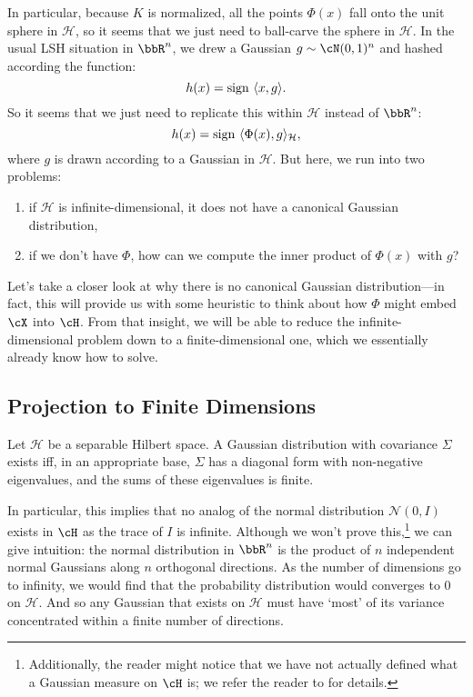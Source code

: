\documentclass[twoside,11pt]{homework}
\begin{document}
In particular, because $K$ is normalized, all the points $\Phi(x)$ fall onto the unit sphere
in $\mathcal{H}$, so it seems that we just need to ball-carve the sphere in $\mathcal{H}$.
In the usual LSH situation in $\bbR^n$, we drew a Gaussian $g \sim \cN(0,1)^n$ and hashed
according the function:
\[h(x) = \operatorname{sign}\ \langle x, g\rangle.\]
So it seems that we just need to replicate this within $\mathcal{H}$ instead of $\bbR^n$:
\[h(x) = \operatorname{sign}\ \langle \Phi(x), g\rangle_\mathcal{H},\]
where $g$ is drawn according to a Gaussian in $\mathcal{H}$. But here, we run into two problems:
\begin{enumerate}
\item if $\mathcal{H}$ is infinite-dimensional, it does not have a canonical Gaussian distribution, 
\item if we don't have $\Phi$, how can we compute the inner product of $\Phi(x)$ with $g$?
\end{enumerate}

Let's take a closer look at why there is no canonical Gaussian distribution---in fact, this will provide us with some heuristic to think about how $\Phi$ might embed $\cX$ into $\cH$. From that insight, we will be able to reduce the infinite-dimensional problem down to a finite-dimensional one, which we essentially already know how to solve.

\subsection{Projection to Finite Dimensions}

\begin{proposition}[{\cite[Example 2.2]{L2012}}] \label{infinite-distribution}Let $\mathcal{H}$ be a separable Hilbert space.
  A Gaussian distribution with covariance $\Sigma$ exists iff, in an appropriate base, $\Sigma$
  has a diagonal form with non-negative eigenvalues, and the sums of these eigenvalues is finite.
\end{proposition}

In particular, this implies that no analog of the normal distribution $\mathcal{N}(0,I)$ exists in $\cH$ as the trace of $I$ is infinite. Although we won't prove this,\footnote{Additionally, the reader might notice that we have not actually defined what a Gaussian measure on $\cH$ is; we refer the reader to \cite{L2012} for details.} we can give intuition: the normal distribution in $\bbR^n$ is the product of $n$ independent normal Gaussians along $n$ orthogonal directions. As the number of dimensions go to infinity, we would find that the probability distribution would converges to 0 on $\mathcal{H}$. And so any Gaussian that exists on $\mathcal{H}$ must have `most' of its variance concentrated within a finite number of directions.
\end{document}
